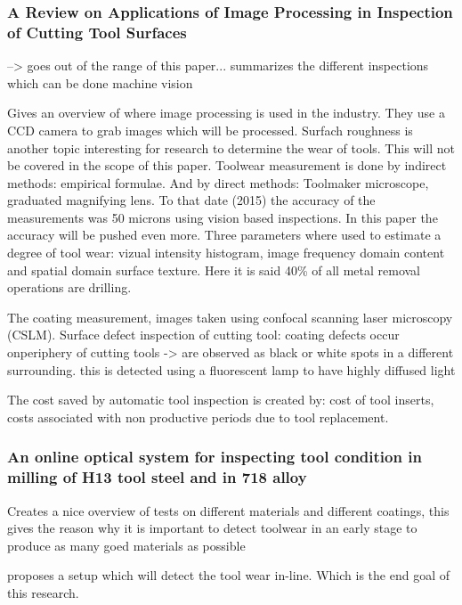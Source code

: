         \subsubsection{A Review on Applications of Image Processing in Inspection of Cutting Tool Surfaces}
        --> goes out of the range of this paper... summarizes the different inspections which can be done
            machine vision
            
            \cite{Prabhu2015} Gives an overview of where image processing is used in the industry. They use a CCD camera to grab images which will be processed. Surfach roughness is another topic interesting for research to determine the wear of tools. This will not be covered in the scope of this paper. Toolwear measurement is done by indirect methods: empirical formulae. And by direct methods: Toolmaker microscope, graduated magnifying lens. To that date (2015) the accuracy of the measurements was 50 microns using vision based inspections. In this paper the accuracy will be pushed even more. Three parameters where used to estimate a degree of tool wear: vizual intensity histogram, image frequency domain content and spatial domain surface texture. Here it is said 40\% of all metal removal operations are drilling.
            
            The coating measurement, images taken using confocal scanning laser microscopy (CSLM). 
            Surface defect inspection of cutting tool: coating defects occur onperiphery of cutting tools -> are observed as black or white spots in a different surrounding. this is detected using a fluorescent lamp to have highly diffused light
            
            The cost saved by automatic tool inspection is created by: cost of tool inserts, costs associated with non productive periods due to tool replacement.
            
        \subsubsection{An online optical system for inspecting tool condition in milling of H13 tool steel and in 718 alloy}
            Creates a nice overview of tests on different materials and different coatings, this gives the reason why it is important to detect toolwear in an early stage to produce as many goed materials as possible
            
            \cite{Li2013} proposes a setup which will detect the tool wear in-line. Which is the end goal of this research. 
            
